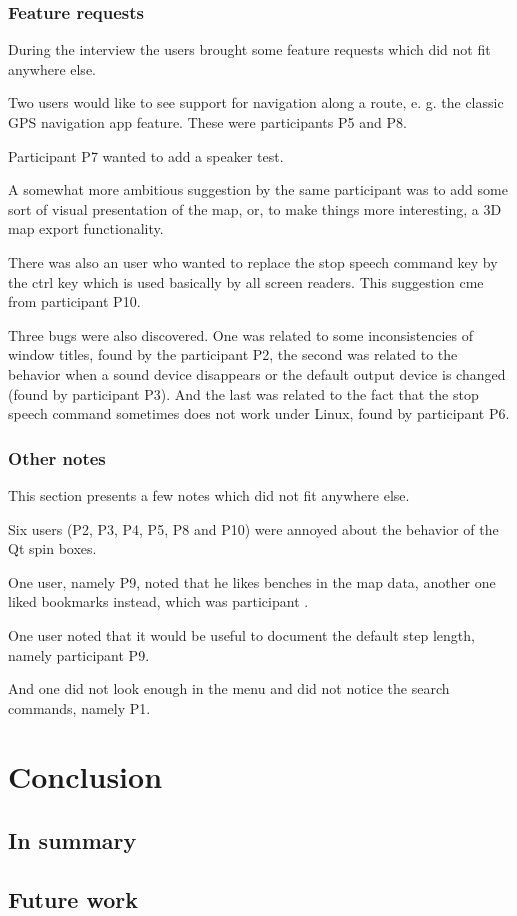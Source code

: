 \documentclass[nolof,digital]{fithesis3}
\begin{document}
\subsection{Feature requests}
During the interview the users brought some feature requests which did not fit anywhere else.

Two users would like to see support for navigation along a route, e. g. the classic GPS navigation app feature. These were participants P5 and P8.

Participant P7 wanted to add a speaker test.

A somewhat more ambitious suggestion by the same participant was to add some sort of visual presentation of the map, or, to make things more interesting, a 3D map export functionality.

There was also an user who wanted to replace the stop speech command key by the ctrl key which is used basically by all screen readers. This suggestion cme from participant P10.

Three bugs were also discovered. One was related to some inconsistencies of window titles, found by the participant P2, the second was related to the behavior when a sound device disappears or the default output device is changed (found by participant P3). And the last was related to the fact that the stop speech command sometimes does not work under Linux, found by participant P6.
\subsection{Other notes}
This section presents a few notes which did not fit anywhere else.

Six users (P2, P3, P4, P5, P8 and P10) were annoyed about the behavior of the Qt spin boxes.

One user, namely P9, noted that he likes benches in the map data, another one liked bookmarks instead, which was participant .

One user noted that it would be useful to document the default step length, namely participant P9.

And one did not look enough in the menu and did not notice the search commands, namely P1.
\chapter{Conclusion}
\section{In summary}
\section{Future work}
\printbibliography
\end{document}
